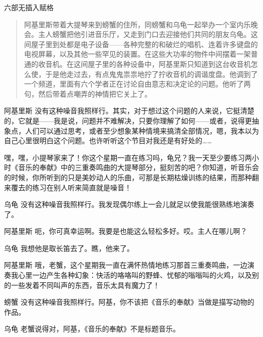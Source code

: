 
\begin{dialog}{六部无插入赋格}

\begin{quote}
阿基里斯带着大提琴来到螃蟹的住所，同螃蟹和乌龟一起举办一个室内乐晚会。主人螃蟹把他引进音乐厅，又走到门口去迎接他们共同的朋友乌龟。这间屋子里到处都是电子设备——各种完整的和破烂的唱机、连着许多键盘的电视屏幕，以及其他一些罕见的装置。在这些大功率的物件中间摆着一架普通的收音机。在这间屋子里的各种设备中，阿基里斯只知道到这台收音机怎么使，于是他走过去，有点鬼鬼祟祟地拧了拧收音机的调谐度盘。他调到了一个频道，里面有六个学者正在讨论自由意志和决定论的问题。他听了两句，然后带着点嘲弄的神情把它关上了。
\end{quote}

\begin{dialogue}

\item[阿基里斯]没有这种噪音我照样行。其实，对于想过这个问题的人来说，它挺清楚的，它就是——我是说，问题并不难解决，只要你理解了如何——或者，说得更抽象点，人们可以通过思考，或者至少想象某种情境来搞清全部情况，嗯，我本以为自己心里很明白这个问题。也许听听这个节目对我还是有好处的……


嘿，嘿，小提琴家来了！你这个星期一直在练习吗，龟兄？我一天至少要练习两小时《音乐的奉献》中的三重奏鸣曲的大提琴部分，挺刻苦的吧？你知道，听音乐会的时候，你所听到的只是美妙动人的乐曲，可那是长期枯燥训练的结果，而那种翻来覆去的练习在别人听来简直就是噪音！

\item[乌龟]没有这种噪音我照样行。我发现偶尔练上一会儿就足以使我能很熟练地演奏了。

\item[阿基里斯]呃，你可真幸运啊。我要是也能这么轻松多好。哎。主人在哪儿啊？

\item[乌龟]我想他是取长笛去了。瞧，他来了。


\item[阿基里斯]哦，老蟹，这个星期我一直在满怀热情地练习那首三重奏鸣曲，一边演奏我心里一边产生各种幻象：快活的咯咯叫的野蜂、忧郁的嗡嗡叫的火鸡，以及别的一些发着不同叫声的东西，音乐太具有魔力了！

\item[螃蟹]没有这种噪音我照样行。阿基，你不该把《音乐的奉献》当做是描写动物的作品。

\item[乌龟]老蟹说得对，阿基，《音乐的奉献》不是标题音乐。


\end{dialogue}
\end{dialog}
